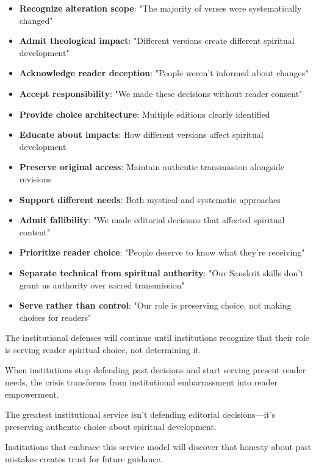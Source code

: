 \documentclass[12pt,twoside]{book}
\begin{document}
\begin{itemize}
\item \textbf{\textbf{Recognize alteration scope}}: "The majority of verses were systematically changed"
\item \textbf{\textbf{Admit theological impact}}: "Different versions create different spiritual development"
\item \textbf{\textbf{Acknowledge reader deception}}: "People weren't informed about changes"
\item \textbf{\textbf{Accept responsibility}}: "We made these decisions without reader consent"

\item \textbf{\textbf{Provide choice architecture}}: Multiple editions clearly identified
\item \textbf{\textbf{Educate about impacts}}: How different versions affect spiritual development
\item \textbf{\textbf{Preserve original access}}: Maintain authentic transmission alongside revisions
\item \textbf{\textbf{Support different needs}}: Both mystical and systematic approaches

\item \textbf{\textbf{Admit fallibility}}: "We made editorial decisions that affected spiritual content"
\item \textbf{\textbf{Prioritize reader choice}}: "People deserve to know what they're receiving"
\item \textbf{\textbf{Separate technical from spiritual authority}}: "Our Sanskrit skills don't grant us authority over sacred transmission"
\item \textbf{\textbf{Serve rather than control}}: "Our role is preserving choice, not making choices for readers"
\end{itemize}

The institutional defenses will continue until institutions recognize that their role is serving reader spiritual choice, not determining it.

When institutions stop defending past decisions and start serving present reader needs, the crisis transforms from institutional embarrassment into reader empowerment.

The greatest institutional service isn't defending editorial decisions—it's preserving authentic choice about spiritual development.

Institutions that embrace this service model will discover that honesty about past mistakes creates trust for future guidance.
\end{document}
